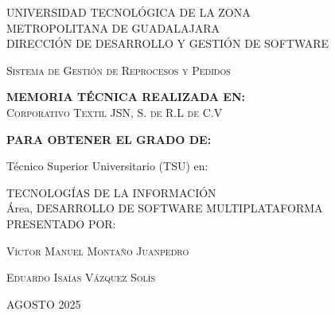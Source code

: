 \documentclass[12pt,letterpaper,spanish]{report}
\begin{document}
\begin{center}

 \begin{minipage}[b]{.9\linewidth}
    \begin{center}
        \vspace{0.2in}
        \large{UNIVERSIDAD TECNOLÓGICA DE LA ZONA \\METROPOLITANA DE GUADALAJARA}\\
        \large{DIRECCIÓN DE DESARROLLO Y GESTIÓN DE SOFTWARE}\\
    \end{center}
\end{minipage}
\vspace{0.3in}


\centerline{\hbox{}}

\LARGE{\textsc{Sistema de Gestión de Reprocesos y Pedidos}}

\vspace{0.2in}
\large{\textbf{MEMORIA TÉCNICA REALIZADA EN:}}
 \\  \textsc{Corporativo Textil JSN, S. de R.L de C.V}

\vspace{0.2in}
\large{\textbf{PARA OBTENER EL GRADO DE:}}

\large{Técnico Superior Universitario (TSU) en:}


\large{TECNOLOGÍAS DE LA INFORMACIÓN\\Área, DESARROLLO DE SOFTWARE MULTIPLATAFORMA }
\\

\vspace{0.2in}
\large{PRESENTADO POR:}


\textsc{Víctor Manuel Montaño Juanpedro}  %


\textsc{Eduardo Isaías Vázquez Solís}  %

\vspace{0.2in}
\small{ AGOSTO 2025}
\end{center}


\newpage

\thispagestyle{empty}
\end{document}
